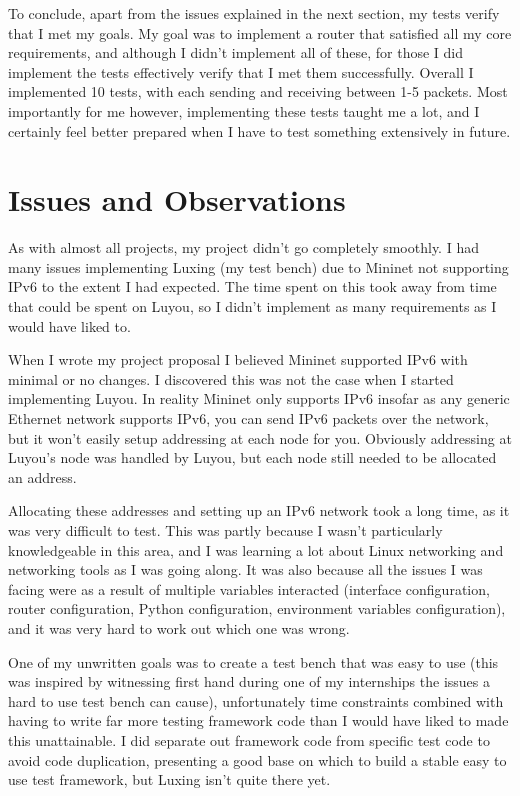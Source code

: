 \documentclass[12pt,a4paper,twoside,openright]{report}
\begin{document}
\bigskip

To conclude, apart from the issues explained in the next section, my tests verify that I met my goals.  My goal was to implement a router that satisfied all my core requirements, and although I didn't implement all of these, for those I did implement the tests effectively verify that I met them successfully.  Overall I implemented 10 tests, with each sending and receiving between 1-5 packets. Most importantly for me however, implementing these tests taught me a lot, and I certainly feel better prepared when I have to test something extensively in future.

\section{Issues and Observations}

As with almost all projects, my project didn't go completely smoothly. I had many issues implementing Luxing (my test bench) due to Mininet not supporting IPv6 to the extent I had expected. The time spent on this took away from time that could be spent on Luyou, so I didn't implement as many requirements as I would have liked to.

\bigskip

When I wrote my project proposal I believed Mininet supported IPv6 with minimal or no changes.  I discovered this was not the case when I started implementing Luyou.  In reality Mininet only supports IPv6 insofar as any generic Ethernet network supports IPv6, you can send IPv6 packets over the network, but it won't easily setup addressing at each node for you.  Obviously addressing at Luyou's node was handled by Luyou, but each node still needed to be allocated an address. 

Allocating these addresses and setting up an IPv6 network took a long time, as it was very difficult to test.  This was partly because I wasn't particularly knowledgeable in this area, and I was learning a lot about Linux networking and networking tools as I was going along. It was also because all the issues I was facing were as a result of multiple variables interacted (interface configuration, router configuration, Python configuration, environment variables configuration), and it was very hard to work out which one was wrong.  

One of my unwritten goals was to create a test bench that was easy to use (this was inspired by witnessing first hand during one of my internships the issues a hard to use test bench can cause), unfortunately time constraints combined with having to write far more testing framework code than I would have liked to made this unattainable.  I did separate out framework code from specific test code to avoid code duplication, presenting a good base on which to build a stable easy to use test framework, but Luxing isn't quite there yet. 
\end{document}
